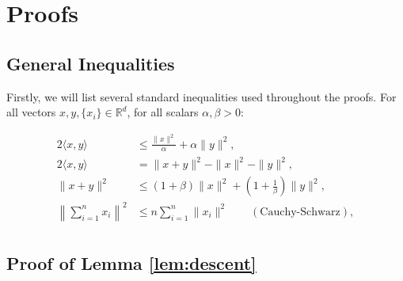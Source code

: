 \documentclass{article}
\begin{document}
\section{Proofs} 
\label{app:proofs}
\subsection{General Inequalities}
Firstly, we will list several standard inequalities used throughout the proofs. For all vectors $x, y, \{x_i\}\in\mathbb{R}^d$, for all scalars $\alpha, \beta > 0$: 

\begin{align}
\label{ineq:scalar} \tag{Scalar} 2\langle x, y \rangle & \leqslant \frac{\|x\|^2}{\alpha} + \alpha \|y\|^2, \\
\label{ineq:norm} \tag{Norm} 2\langle x, y \rangle & = \|x + y\|^2 - \|x\|^2 - \|y\|^2, \\
\label{ineq:quad} \tag{Quad} \|x + y\|^2 & \leqslant (1 + \beta)\|x\|^2 + (1 + \frac{1}{\beta})\|y\|^2, \\
\label{ineq:cs} \tag{CS}  \left\|\sum_{i=1}^{n} x_i\right\|^2 & \leqslant  n \sum_{i=1}^{n} \|x_i\|^2  \quad \quad (\text{Cauchy-Schwarz}),\\
\end{align}

\subsection{Proof of Lemma \ref{lem:descent}}
\end{document}
